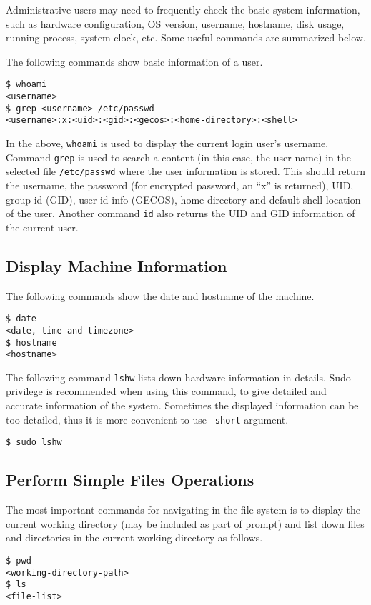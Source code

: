 Administrative users may need to frequently check the basic system information, such as hardware configuration, OS version, username, hostname, disk usage, running process, system clock, etc. Some useful commands are summarized below.

The following commands show basic information of a user.
\begin{lstlisting}
$ whoami
<username>
$ grep <username> /etc/passwd
<username>:x:<uid>:<gid>:<gecos>:<home-directory>:<shell>
\end{lstlisting}
In the above, \verb|whoami| is used to display the current login user's username. Command \verb|grep| is used to search a content (in this case, the user name) in the selected file \verb|/etc/passwd| where the user information is stored. This should return the username, the password (for encrypted password, an ``x'' is returned), UID, group id (GID), user id info (GECOS), home directory and default shell location of the user.
Another command \verb|id| also returns the UID and GID information of the current user.

\subsection{Display Machine Information}

The following commands show the date and hostname of the machine.
\begin{lstlisting}
$ date
<date, time and timezone>
$ hostname
<hostname>
\end{lstlisting}

The following command \verb|lshw| lists down hardware information in details. Sudo privilege is recommended when using this command, to give detailed and accurate information of the system. Sometimes the displayed information can be too detailed, thus it is more convenient to use \verb|-short| argument.
\begin{lstlisting}
$ sudo lshw
\end{lstlisting}

\subsection{Perform Simple Files Operations}

The most important commands for navigating in the file system is to display the current working directory (may be included as part of prompt) and list down files and directories in the current working directory as follows.
\begin{lstlisting}
$ pwd
<working-directory-path>
$ ls
<file-list>
\end{lstlisting}

